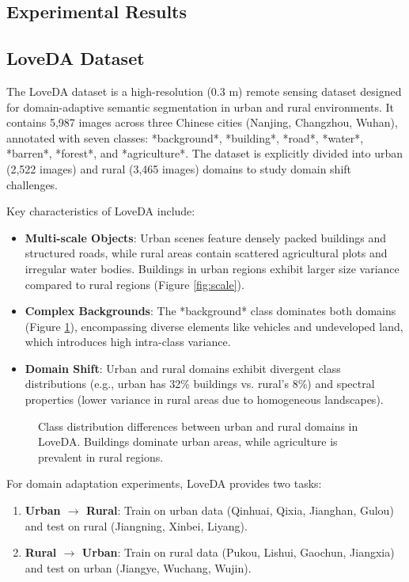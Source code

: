 \documentclass{article}
\begin{document}
\begin{multicols}{2}
		\section{Experimental Results}
		\subsection{LoveDA Dataset}  
		The LoveDA dataset \cite{loveda2021} is a high-resolution (0.3 m) remote sensing dataset designed for domain-adaptive semantic segmentation in urban and rural environments. It contains 5,987 images across three Chinese cities (Nanjing, Changzhou, Wuhan), annotated with seven classes: *background*, *building*, *road*, *water*, *barren*, *forest*, and *agriculture*. The dataset is explicitly divided into urban (2,522 images) and rural (3,465 images) domains to study domain shift challenges.  
		
		Key characteristics of LoveDA include:  
		\begin{itemize}  
			\item \textbf{Multi-scale Objects}: Urban scenes feature densely packed buildings and structured roads, while rural areas contain scattered agricultural plots and irregular water bodies. Buildings in urban regions exhibit larger size variance compared to rural regions (Figure \ref{fig:scale}).  
			\item \textbf{Complex Backgrounds}: The *background* class dominates both domains (Figure \ref{fig:class_dist}), encompassing diverse elements like vehicles and undeveloped land, which introduces high intra-class variance.  
			\item \textbf{Domain Shift}: Urban and rural domains exhibit divergent class distributions (e.g., urban has 32\% buildings vs. rural’s 8\%) and spectral properties (lower variance in rural areas due to homogeneous landscapes).  
		\end{itemize}  
		
		\begin{figure}[ht]  
			\centering  

			\caption{Class distribution differences between urban and rural domains in LoveDA. Buildings dominate urban areas, while agriculture is prevalent in rural regions.}  
			\label{fig:class_dist}  
		\end{figure}  
		
		For domain adaptation experiments, LoveDA provides two tasks:  
		\begin{enumerate}  
			\item \textbf{Urban $\rightarrow$ Rural}: Train on urban data (Qinhuai, Qixia, Jianghan, Gulou) and test on rural (Jiangning, Xinbei, Liyang).  
			\item \textbf{Rural $\rightarrow$ Urban}: Train on rural data (Pukou, Lishui, Gaochun, Jiangxia) and test on urban (Jiangye, Wuchang, Wujin).  
		\end{enumerate}  
		

\end{multicols}
\end{document}

